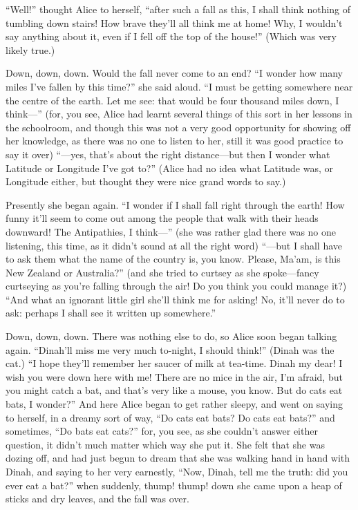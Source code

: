\documentclass[
  12pt,
  twoside]{article}
\begin{document}
\begin{multicols}{3}
“Well!” thought Alice to herself, “after such a fall as this, I shall think nothing of tumbling down stairs! How brave they’ll all think me at home! Why, I wouldn’t say anything about it, even if I fell off the top of the house!” (Which was very likely true.)

\end{multicols}

Down, down, down. Would the fall never come to an end? ``I wonder how
many miles I've fallen by this time?'' she said aloud. ``I must be
getting somewhere near the centre of the earth. Let me see: that would
be four thousand miles down, I think---'' (for, you see, Alice had
learnt several things of this sort in her lessons in the schoolroom, and
though this was not a very good opportunity for showing off her
knowledge, as there was no one to listen to her, still it was good
practice to say it over) ``---yes, that's about the right distance---but
then I wonder what Latitude or Longitude I've got to?'' (Alice had no
idea what Latitude was, or Longitude either, but thought they were nice
grand words to say.)

Presently she began again. ``I wonder if I shall fall right through the
earth! How funny it'll seem to come out among the people that walk with
their heads downward! The Antipathies, I think---'' (she was rather glad
there was no one listening, this time, as it didn't sound at all the
right word) ``---but I shall have to ask them what the name of the
country is, you know. Please, Ma'am, is this New Zealand or Australia?''
(and she tried to curtsey as she spoke---fancy curtseying as you're
falling through the air! Do you think you could manage it?) ``And what
an ignorant little girl she'll think me for asking! No, it'll never do
to ask: perhaps I shall see it written up somewhere.''

Down, down, down. There was nothing else to do, so Alice soon began
talking again. ``Dinah'll miss me very much to-night, I should think!''
(Dinah was the cat.) ``I hope they'll remember her saucer of milk at
tea-time. Dinah my dear! I wish you were down here with me! There are no
mice in the air, I'm afraid, but you might catch a bat, and that's very
like a mouse, you know. But do cats eat bats, I wonder?'' And here Alice
began to get rather sleepy, and went on saying to herself, in a dreamy
sort of way, ``Do cats eat bats? Do cats eat bats?'' and sometimes, ``Do
bats eat cats?'' for, you see, as she couldn't answer either question,
it didn't much matter which way she put it. She felt that she was dozing
off, and had just begun to dream that she was walking hand in hand with
Dinah, and saying to her very earnestly, ``Now, Dinah, tell me the
truth: did you ever eat a bat?'' when suddenly, thump! thump! down she
came upon a heap of sticks and dry leaves, and the fall was over.
\end{document}
